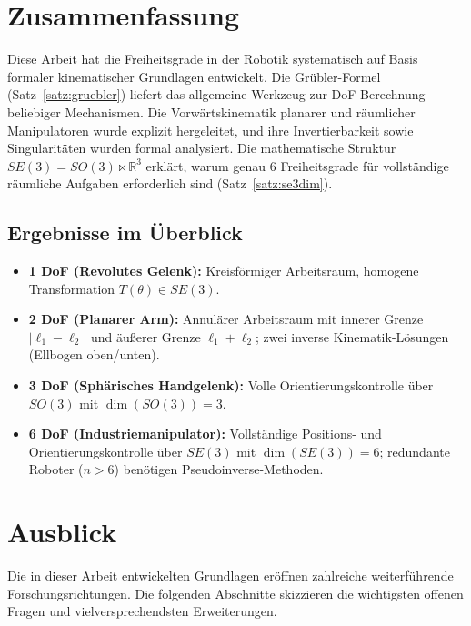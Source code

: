 ﻿\documentclass[a4paper,12pt]{article}
\theoremstyle{definition}
\begin{document}
\section{Zusammenfassung}

Diese Arbeit hat die Freiheitsgrade in der Robotik systematisch auf Basis formaler kinematischer Grundlagen entwickelt. Die Grübler-Formel (Satz~\ref{satz:gruebler}) liefert das allgemeine Werkzeug zur DoF-Berechnung beliebiger Mechanismen. Die Vorwärtskinematik planarer und räumlicher Manipulatoren wurde explizit hergeleitet, und ihre Invertierbarkeit sowie Singularitäten wurden formal analysiert. Die mathematische Struktur $SE(3) = SO(3) \ltimes \mathbb{R}^3$ erklärt, warum genau 6 Freiheitsgrade für vollständige räumliche Aufgaben erforderlich sind (Satz~\ref{satz:se3dim}).

\subsection{Ergebnisse im Überblick}

\begin{itemize}
	\item \textbf{1 DoF (Revolutes Gelenk):} Kreisförmiger Arbeitsraum, homogene Transformation $T(\theta) \in SE(3)$.
	\item \textbf{2 DoF (Planarer Arm):} Annulärer Arbeitsraum mit innerer Grenze $|\ell_1-\ell_2|$ und äußerer Grenze $\ell_1+\ell_2$; zwei inverse Kinematik-Lösungen (Ellbogen oben/unten).
	\item \textbf{3 DoF (Sphärisches Handgelenk):} Volle Orientierungskontrolle über $SO(3)$ mit $\dim(SO(3)) = 3$.
	\item \textbf{6 DoF (Industriemanipulator):} Vollständige Positions- und Orientierungskontrolle über $SE(3)$ mit $\dim(SE(3)) = 6$; redundante Roboter ($n > 6$) benötigen Pseudoinverse-Methoden.
\end{itemize}

\section{Ausblick}
\label{sec:ausblick}

Die in dieser Arbeit entwickelten Grundlagen eröffnen zahlreiche weiterführende Forschungsrichtungen. Die folgenden Abschnitte skizzieren die wichtigsten offenen Fragen und vielversprechendsten Erweiterungen.
\end{document}
